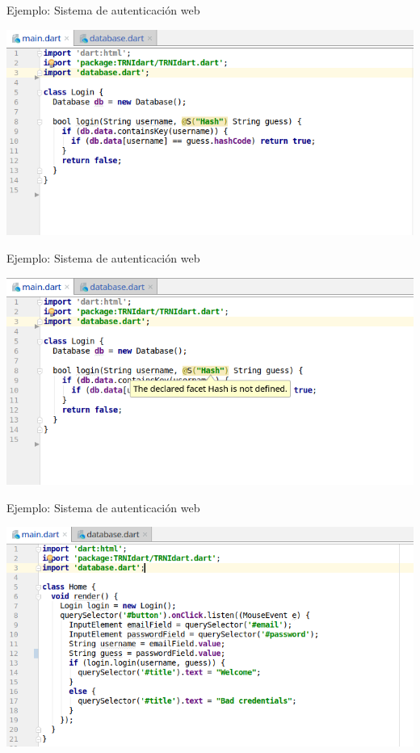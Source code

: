 \documentclass[aspectratio=169,10pt]{beamer}
\begin{document}
\begin{frame}[fragile]{Ejemplo: Sistema de autenticación web}
	\begin{center}
		\includegraphics[width=1.0\textwidth]{images/login25.png}
	\end{center}
\end{frame}

\begin{frame}[fragile]{Ejemplo: Sistema de autenticación web}
	\begin{center}
		\includegraphics[width=1.0\textwidth]{images/login3.png}
	\end{center}
\end{frame}

\begin{frame}[fragile]{Ejemplo: Sistema de autenticación web}
	\begin{center}
		\includegraphics[width=1.0\textwidth]{images/html1.png}
	\end{center}
\end{frame}
\end{document}
